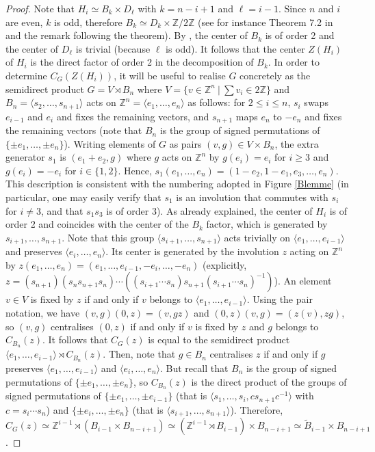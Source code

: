 \documentclass[a4paper, 11pt]{amsart}
\theoremstyle{definition}
\theoremstyle{remark}
\renewcommand{\leq}{\leqslant}
\renewcommand{\geq}{\geqslant}
\begin{document}
\begin{proof}
Note that $H_i\simeq B_{k}\times D_{\ell}$ with $k=n-i+1$ and $\ell=i-1$. Since $n$ and $i$ are even, $k$ is odd, therefore $B_{k}\simeq D_k\times \mathbb{Z}/2\mathbb{Z}$ (see for instance Theorem 7.2 in \cite{Paris} and the remark following the theorem). By \cite{Zhou}, the center of $B_k$ is of order 2 and the center of $D_{\ell}$ is trivial (because $\ell$ is odd). It follows that the center $Z(H_i)$ of $H_i$ is the direct factor of order 2 in the decomposition of $B_k$. In order to determine $C_G(Z(H_i))$, it will be useful to realise $G$ concretely as the semidirect product $G=V\rtimes B_n$ where $V=\lbrace v\in\mathbb{Z}^n \ \vert \ \sum v_i\in 2\mathbb{Z}\rbrace$ and $B_n=\langle s_2,\ldots,s_{n+1}\rangle$ acts on $\mathbb{Z}^n=\langle e_1,\ldots,e_n\rangle$ as follows: for $2\leq i\leq n$, $s_i$ swaps $e_{i-1}$ and $e_i$ and fixes the remaining vectors, and $s_{n+1}$ maps $e_n$ to $-e_n$ and fixes the remaining vectors (note that $B_n$ is the group of signed permutations of $\lbrace \pm e_1,\ldots,\pm e_n\rbrace$). Writing elements of $G$ as pairs $(v,g)\in V\times B_n$, the extra generator $s_1$ is $(e_1+e_2,g)$ where $g$ acts on $\mathbb{Z}^n$ by $g(e_i)=e_i$ for $i\geq 3$ and $g(e_i)=-e_i$ for $i\in\lbrace 1,2\rbrace$. Hence, $s_1(e_1,\ldots,e_n)=(1-e_2,1-e_1,e_3,\ldots,e_n)$. This description is consistent with the numbering adopted in Figure \ref{Blemme} (in particular, one may easily verify that $s_1$ is an involution that commutes with $s_i$ for $i\neq 3$, and that $s_1s_3$ is of order 3). As already explained, the center of $H_i$ is of order 2 and coincides with the center of the $B_k$ factor, which is generated by $s_{i+1},\ldots,s_{n+1}$. Note that this group $\langle s_{i+1},\ldots,s_{n+1}\rangle$ acts trivially on $\langle e_1,\ldots,e_{i-1}\rangle$ and preserves $\langle e_i,\ldots,e_{n}\rangle$. Its center is generated by the involution $z$ acting on $\mathbb{Z}^n$ by $z(e_1,\ldots,e_n)=(e_1,\ldots,e_{i-1},-e_i,\ldots,-e_n)$ (explicitly, $z=(s_{n+1})(s_ns_{n+1}s_n)\cdots ((s_{i+1}\cdots s_n)s_{n+1}(s_{i+1}\cdots s_n)^{-1})$). An element $v\in V$ is fixed by $z$ if and only if $v$ belongs to $\langle e_1,\ldots,e_{i-1} \rangle$. Using the pair notation, we have $(v,g)(0,z)=(v,gz)$ and $(0,z)(v,g)=(z(v),zg)$, so $(v,g)$ centralises $(0,z)$ if and only if $v$ is fixed by $z$ and $g$ belongs to $C_{B_n}(z)$. It follows that $C_G(z)$ is equal to the semidirect product $\langle e_1,\ldots,e_{i-1}\rangle \rtimes C_{B_n}(z)$. Then, note that $g\in B_n$ centralises $z$ if and only if $g$ preserves $\langle e_1,\ldots,e_{i-1} \rangle$ and $\langle e_i,\ldots,e_{n} \rangle$. But recall that $B_n$ is the group of signed permutations of $\lbrace \pm e_1,\ldots,\pm e_n\rbrace$, so $C_{B_n}(z)$ is the direct product of the groups of signed permutations of $\lbrace \pm e_1,\ldots,\pm e_{i-1}\rbrace$ (that is $\langle s_1,\ldots,s_i,cs_{n+1}c^{-1}\rangle$ with $c=s_{i}\cdots s_n$) and $\lbrace \pm e_{i},\ldots,\pm e_n\rbrace$ (that is $\langle s_{i+1},\ldots,s_{n+1}\rangle$). Therefore, $C_G(z)\simeq \mathbb{Z}^{i-1}\rtimes (B_{i-1}\times B_{n-i+1})\simeq (\mathbb{Z}^{i-1}\rtimes B_{i-1})\times B_{n-i+1}\simeq \tilde{B}_{i-1}\times B_{n-i+1}$.\end{proof}
\end{document}
